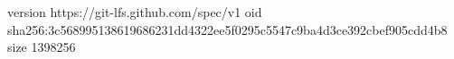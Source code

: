 version https://git-lfs.github.com/spec/v1
oid sha256:3c568995138619686231dd4322ee5f0295c5547c9ba4d3ce392cbef905cdd4b8
size 1398256
